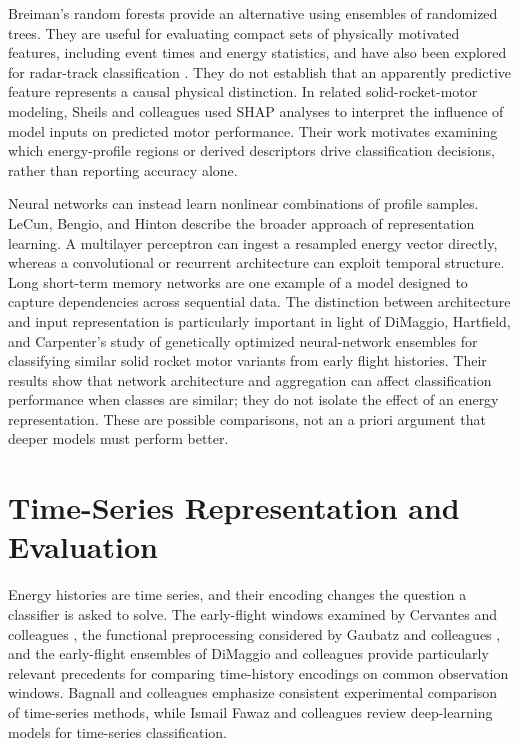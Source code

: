 Breiman's random forests \cite{breiman2001forests} provide
an alternative using ensembles of randomized trees.
They are useful for evaluating compact sets of physically
motivated features, including event times and energy
statistics, and have also been explored for radar-track
classification \cite{jochumsen2016recursive}. They
do not establish that an apparently predictive feature
represents a causal physical distinction. In related
solid-rocket-motor modeling, Sheils and colleagues
\cite{sheils2025explainability} used SHAP analyses to
interpret the influence of model inputs on predicted
motor performance. Their work motivates examining
which energy-profile regions or derived descriptors
drive classification decisions, rather than reporting
accuracy alone.

Neural networks can instead learn nonlinear combinations
of profile samples. LeCun, Bengio, and Hinton
\cite{lecun2015deep} describe the broader approach of
representation learning. A multilayer perceptron can
ingest a resampled energy vector directly, whereas a
convolutional or recurrent architecture can exploit
temporal structure. Long short-term memory networks
\cite{hochreiter1997lstm} are one example of a model
designed to capture dependencies across sequential data.
The distinction between architecture and input
representation is particularly important in light of
DiMaggio, Hartfield, and Carpenter's
\cite{dimaggio2026ensemble} study of genetically
optimized neural-network ensembles for classifying
similar solid rocket motor variants from early
flight histories. Their results show that
network architecture and aggregation can affect
classification performance when classes are similar;
they do not isolate the effect of an energy representation.
These are possible comparisons, not an a priori
argument that deeper models must perform better.

\section{Time-Series Representation and Evaluation}
\label{sec:lit-timeseries}

Energy histories are time series, and their encoding changes
the question a classifier is asked to solve. The early-flight
windows examined by Cervantes and colleagues
\cite{cervantes2024telemetry}, the functional
preprocessing considered by Gaubatz and colleagues
\cite{gaubatz2025fda}, and the early-flight
ensembles of DiMaggio and colleagues
\cite{dimaggio2026ensemble} provide
particularly relevant precedents for comparing
time-history encodings on common observation windows. Bagnall and
colleagues \cite{bagnall2017bakeoff} emphasize consistent
experimental comparison of time-series methods, while
Ismail Fawaz and colleagues \cite{fawaz2019review}
review deep-learning models for time-series classification.


